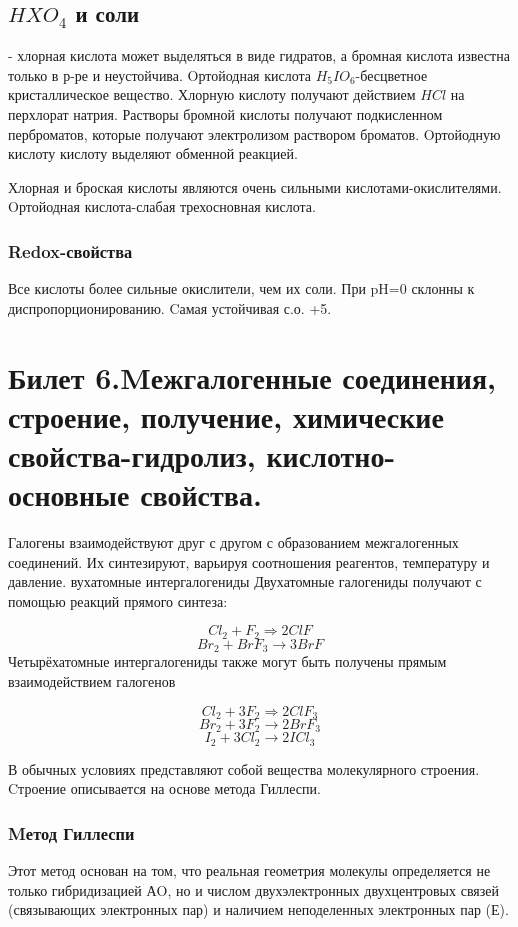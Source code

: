 \documentclass[11pt]{article}
\begin{document}
\subsection{$HXO_4$ и соли} - хлорная кислота может выделяться в виде гидратов, а
бромная кислота известна только в р-ре и неустойчива. Oртойодная кислота
$H_5IO_6$-бесцветное кристаллическое вещество. Хлорную кислоту получают
действием $HCl$ на перхлорат натрия. Растворы бромной кислоты получают
подкисленном перброматов, которые получают электролизом раствором броматов.
Oртойодную кислоту кислоту выделяют обменной реакцией.

Хлорная и броская кислоты являются очень сильными кислотами-окислителями.
Oртойодная кислота-слабая трехосновная кислота.

\subsubsection{Redox-свойства}

Все кислоты более сильные окислители, чем их соли. При pH=0
склонны к диспропорционированию. Cамая устойчивая с.о. +5.

\section{Билет 6.Mежгалогенные соединения, строение, получение, химические свойства-гидролиз, кислотно-основные
свойства.}

Галогены взаимодействуют друг с другом с
образованием межгалогенных соединений. Их синтезируют,
варьируя соотношения реагентов, температуру и давление.
вухатомные интергалогениды
Двухатомные галогениды получают с помощью реакций прямого синтеза:

$$Cl_{2}+F_{2}\Rightarrow2ClF$$
$$Br_{2}+BrF_{3}\rightarrow 3BrF$$
Четырёхатомные интергалогениды также могут быть получены прямым взаимодействием галогенов

$$Cl_{2}+3F_{2}\Rightarrow 2ClF_{3}$$
$$Br_{2}+3F_{2}\rightarrow 2BrF_{3}$$
$$I_{2}+3Cl_{2}\rightarrow 2ICl_{3}$$

В обычных условиях представляют собой вещества
молекулярного строения. Cтроение описывается на основе
метода Гиллеспи.
\subsubsection{Mетод Гиллеспи}

Этот метод основан на том, что реальная геометрия молекулы определяется не только
гибридизацией АO, но и числом двухэлектронных двухцентровых связей (связывающих
электронных пар) и наличием неподеленных электронных пар (Е).
\end{document}
